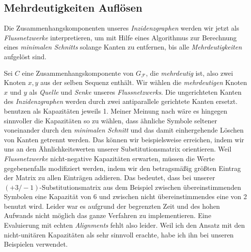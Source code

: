 \begin{center}
\end{center}

\subsection{Mehrdeutigkeiten Auflösen}

Die Zusammenhangskomponenten unseres \emph{Inzidenzgraphen} werden wir jetzt als \emph{Flussnetzwerke} interpretieren, um mit Hilfe eines Algorithmus zur Berechnung eines \emph{minimalen Schnitts} solange Kanten zu entfernen, bis alle \emph{Mehrdeutigkeiten} aufgelöst sind.

Sei $C$ eine Zusammenhangskomponente von $G_{\mathcal{F}}$, die \emph{mehrdeutig} ist, also zwei Knoten $x,y$ aus der selben Sequenz enthält. Wir wählen die \emph{mehrdeutigen} Knoten $x$ und $y$ als \emph{Quelle} und \emph{Senke} unseres \emph{Flussnetzwerks}. Die ungerichteten Kanten des \emph{Inzidenzgraphen} werden durch zwei antiparallele gerichtete Kanten ersetzt. \cite{cpm10} benutzen als Kapazitäten jeweils 1. Meiner Meinung nach wäre es hingegen sinnvoller die Kapazitäten so zu wählen, dass ähnliche Symbole seltener voneinander durch den \emph{minimalen Schnitt} und das damit einhergehende Löschen von Kanten getrennt werden. Das können wir beispielsweise erreichen, indem wir uns an den Ähnlichkeitswerten unserer Substitutionsmatrix orientieren. Weil \emph{Flussnetzwerke} nicht-negative Kapazitäten erwarten, müssen die Werte gegebenenfalls modifiziert werden, indem wir den betragsmäßig größten Eintrag der Matrix zu allen Einträgen addieren. Das bedeutet, dass bei unserer $(+3/-1)$-Substitutionsmatrix aus dem Beispiel zwischen übereinstimmenden Symbolen eine Kapazität von 6 und zwischen nicht übereinstimmendes eine von 2 benutzt wird. Leider war es aufgrund der begrenzten Zeit und des hohen Aufwands nicht möglich das ganze Verfahren zu implementieren. Eine Evaluierung mit echten \emph{Alignments} fehlt also leider. Weil ich den Ansatz mit den nicht-unitären Kapazitäten als sehr sinnvoll erachte, habe ich ihn bei unseren Beispielen verwendet.


